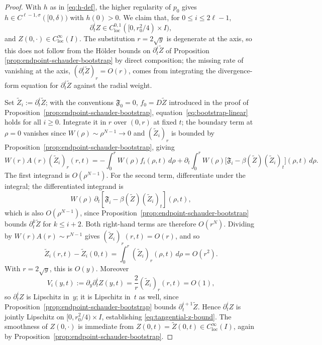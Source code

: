 \documentclass[11pt]{amsart}
\newcommand{\dd}{\,d}
\newcommand{\loc}{\mathrm{loc}}
\begin{document}
\begin{proof}
With \(h\) as in \eqref{eq:h-def}, the higher regularity of \(p_0\) gives
\(h\in C^{\ell-1,\sigma}([0,\delta))\) with \(h(0)>0\). We claim that, for
\(0\le i\le2\ell-1\),
\begin{equation}
\label{eq:tangential-z-bound}
        \partial_t^i Z\in C^{0,1}_{\loc}([0,r_0^2/4)\times I),
\end{equation}
and \(Z(0,\cdot)\in C^\infty_{\loc}(I)\). The substitution \(r=2\sqrt y\)
is degenerate at the axis, so this does not follow from the H\"older
bounds on \(\partial_t^i\widetilde Z\) of Proposition
\ref{prop:endpoint-schauder-bootstrap} by direct composition; the missing
rate of vanishing at the axis, \((\partial_t^i\widetilde Z)_r=O(r)\), comes from integrating the
divergence-form equation for \(\partial_t^i\widetilde Z\) against the radial weight.

Set \(\widetilde Z_i:=\partial_t^i\widetilde Z\); with the conventions
\(\mathfrak F_0=0\), \(f_0=D\widetilde Z\) introduced in the proof of
Proposition~\ref{prop:endpoint-schauder-bootstrap},
equation~\eqref{eq:bootstrap-linear} holds for all \(i\ge0\). Integrate
it in \(r\) over \((0,r)\) at fixed \(t\); the boundary term at
\(\rho=0\) vanishes since \(W(\rho)\sim\rho^{N-1}\to0\) and
\((\widetilde Z_i)_r\) is bounded by
Proposition~\ref{prop:endpoint-schauder-bootstrap}, giving
\[
        W(r)A(r)(\widetilde Z_i)_r(r,t)
        =-\int_0^rW(\rho)f_i(\rho,t)\dd\rho
        +\partial_t\!\int_0^rW(\rho)\bigl[\mathfrak F_i-\beta(\widetilde Z)(\widetilde Z_i)_t\bigr](\rho,t)\dd\rho .
\]
The first integrand is \(O(\rho^{N-1})\). For the second term, differentiate
under the integral; the differentiated integrand is
\[
        W(\rho)\,\partial_t\!\left[
        \mathfrak F_i-\beta(\widetilde Z)(\widetilde Z_i)_t
        \right](\rho,t),
\]
which is also \(O(\rho^{N-1})\), since
Proposition~\ref{prop:endpoint-schauder-bootstrap} bounds
\(\partial_t^k\widetilde Z\) for \(k\le i+2\). Both right-hand terms are therefore
\(O(r^N)\). Dividing by \(W(r)A(r)\sim r^{N-1}\) gives \((\widetilde Z_i)_r(r,t)=O(r)\),
and so
\[
        \widetilde Z_i(r,t)-\widetilde Z_i(0,t)
        =\int_0^r(\widetilde Z_i)_r(\rho,t)\dd\rho
        =O(r^2) .
\]
With \(r=2\sqrt y\), this is \(O(y)\). Moreover
\begin{equation}
\label{eq:Vi-bounded}
        V_i(y,t):=\partial_y\partial_t^iZ(y,t)
        =\frac2r(\widetilde Z_i)_r(r,t)=O(1),
\end{equation}
so \(\partial_t^iZ\) is Lipschitz in~\(y\); it is Lipschitz in~\(t\) as
well, since Proposition~\ref{prop:endpoint-schauder-bootstrap} bounds
\(\partial_t^{i+1}\widetilde Z\). Hence \(\partial_t^iZ\) is jointly Lipschitz on
\([0,r_0^2/4)\times I\), establishing \eqref{eq:tangential-z-bound}. The
smoothness of \(Z(0,\cdot)\) is immediate from
\(Z(0,t)=\widetilde Z(0,t)\in C^\infty_{\loc}(I)\), again by
Proposition~\ref{prop:endpoint-schauder-bootstrap}.


\end{proof}
\end{document}
